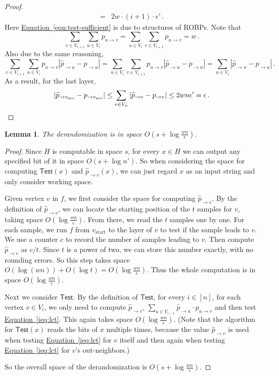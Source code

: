 \documentclass[11pt]{article}
\numberwithin{equation}{section}
\newtheorem{lemma}[theorem]{Lemma}
\theoremstyle{definition}
\theoremstyle{plain}
\newcommand{\expeqref}[2]{\hyperref[#2]{#1~\eqref{#2}}}
\begin{document}
\begin{proof}
\begin{align}
={} & 2w \cdot (i + 1) \cdot \epsilon'\,. \nonumber
\end{align}
Here \expeqref{Equation}{eqn:test-sufficient} is due to  structures of ROBPs. Note that 
$$\sum_{v\in V_{i+1}} \sum_{u\in V_i} p_{u \to v} =  \sum_{u\in V_i} \sum_{v\in V_{i+1}} p_{u \to v}  = w\,.$$ 
Also due to the same reasoning,
$$\sum_{v\in V_{i+1}} \sum_{u\in V_i} p_{u \to v}|\widehat{p}_{ \to u} - p_{ \to u}| = \sum_{u\in V_i} \sum_{v\in V_{i+1}} p_{u \to v} |\widehat{p}_{ \to u} - p_{ \to u}| = \sum_{u\in V_i} |\widehat{p}_{ \to u} -p_{ \to u}|\,.$$
As a result, for the last layer,
\[ |\widehat{p}_{\to v_{\text{acc}}} - p_{ \to v_{\text{acc}}}| \leq \sum_{v\in  V_{n }} |\widehat{p}_{\to v} - p_{ \to v}| \leq 2wn \epsilon' = \epsilon\,. \qedhere \]
\end{proof}


\begin{lemma} \label{lem:DrandIsInLogspace}
The derandomization is in space $O(s+\log \frac{wn}{\epsilon})$.
\end{lemma}

\begin{proof}
Since $H$ is computable in space $s$, for every $x\in H$ we can output any specified bit of it in space $O(s+\log n')$. So when considering the space for computing $ \mathsf{Test}(x)$ and $ \widehat{p}_{\to v}(x)$, we can just regard $x$ as an input string and only consider working space.

Given vertex $v$ in $f$, we first consider the space for computing $\widehat{p}_{\to v}$. By the definition of $\widehat{p}_{\to v}$, we can locate the starting position of the $t$ samples for $v$, taking space $O(\log \frac{wn}{\epsilon})$. From there, we read the $t$ samples one by one. For each sample, we run $f$ from $v_{\text{start}}$ to the layer of $v$ to test if the sample leads to $v$. We use a counter $c$ to record the number of samples leading to $v$. Then compute $\widehat{p}_{\to v}$ as $c/t$. Since $t$ is a power of two, we can store this number exactly, with no rounding errors. So this step takes space $O(\log (wn))+O(\log t) =  O(\log \frac{wn}{\epsilon})$. Thus the whole computation is in space $O(\log \frac{wn}{\epsilon})$.

Next we consider $\mathsf{Test}$. By the definition of $\mathsf{Test}$, for every $i\in [n]$, for each vertex $v \in V_i$, we only need to compute $\widehat{p}_{\to v}$, $ \sum_{u \in V_{i-1} } \widehat{p}_{\to u} \cdot p_{u \to v} $ and then test \expeqref{Equation}{ieq:lct}. This again takes space $O(\log \frac{wn}{\epsilon})$. (Note that the algorithm for $\mathsf{Test}(x)$ reads the bits of $x$ multiple times, because the value $\widehat{p}_{\to v}$ is used when testing \expeqref{Equation}{ieq:lct} for $v$ itself and then again when testing \expeqref{Equation}{ieq:lct} for $v$'s out-neighbors.)

So the overall space of the derandomization is $O(s+\log \frac{wn}{\epsilon})$.
\end{proof}
\end{document}
